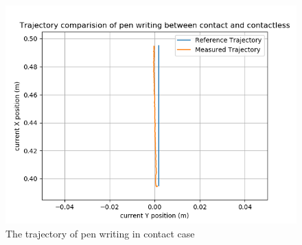 \documentclass[report.tex]{subfiles}
\begin{document}
    \begin{figure}[H]
        \captionsetup[figure]{justification=centering}
                \centering
                \includegraphics[width=0.8\linewidth]{images/us2_contact_traj.png}
                \caption{The trajectory of pen writing in contact case}
                \label{fig:us2_con_plot}
            \end{figure}
\end{document}
